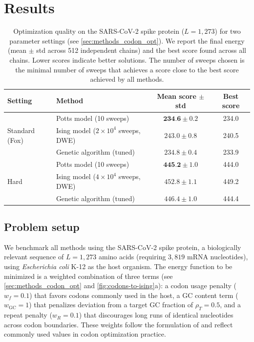 \documentclass[11pt,twocolumn]{article}
\begin{document}
\section{Results}

\begin{table}[htbp]
\centering
\caption{Optimization quality on the SARS-CoV-2 spike protein ($L = 1{,}273$) for two parameter settings (see \cref{sec:methods_codon_opt}). We report the final energy (mean $\pm$ std across 512 independent chains) and the best score found across all chains. Lower scores indicate better solutions. The number of sweeps chosen is the minimal number of sweeps that achieves a score close to the best score achieved by all methods.}
\label{tab:scores}
\vspace{2mm}
\begin{tabular}{llcc}
\toprule
Setting & Method & Mean score $\pm$ std & Best score \\
\midrule
\multirow{3}{*}{Standard (Fox)} & Potts model (10 sweeps) & $\textbf{234.6} \pm 0.2$ & 234.0 \\
 & Ising model ($2 \times 10^4$ sweeps, DWE) & $243.0 \pm 0.8$ & 240.5 \\
 & Genetic algorithm (tuned) & $234.8 \pm 0.4$ & 233.9 \\
\midrule
\multirow{3}{*}{Hard} & Potts model (10 sweeps) & $\textbf{445.2} \pm 1.0$ & 444.0 \\
 & Ising model ($4 \times 10^4$ sweeps, DWE) & $452.8 \pm 1.1$ & 449.2 \\
 & Genetic algorithm (tuned) & $446.4 \pm 1.0$ & 444.4 \\
\bottomrule
\end{tabular}
\end{table}

\subsection{Problem setup}\label{sec:results_setup}

We benchmark all methods using the SARS-CoV-2 spike protein, a biologically relevant sequence of $L = 1{,}273$ amino acids (requiring $3{,}819$ mRNA nucleotides), using \emph{Escherichia coli} K-12 as the host organism.
The energy function to be minimized is a weighted combination of three terms (see \cref{sec:methods_codon_opt} and \cref{fig:codons-to-ising}a): a codon usage penalty ($w_f = 0.1$) that favors codons commonly used in the host, a GC content term ($w_\text{GC} = 1$) that penalizes deviation from a target GC fraction of $\rho_T = 0.5$, and a repeat penalty ($w_R = 0.1$) that discourages long runs of identical nucleotides across codon boundaries.
These weights follow the formulation of \cite{fox2021mrna} and reflect commonly used values in codon optimization practice.
\end{document}
